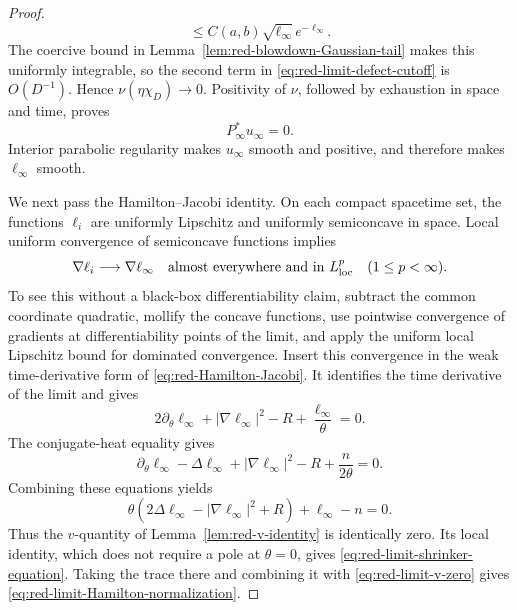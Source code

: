 \documentclass[10pt]{coll-l}
\theoremstyle{definition}
\theoremstyle{remark}
\numberwithin{section}{chapter}
\numberwithin{equation}{chapter}
\begin{document}
\begin{proof}
\begin{equation}
 \leq C(a,b)\sqrt{\ell_\infty}\,e^{-\ell_\infty}.      \label{eq:red-limit-gradient-density}
\end{equation}
The coercive bound in Lemma~\ref{lem:red-blowdown-Gaussian-tail} makes this
uniformly integrable, so the second term in
\eqref{eq:red-limit-defect-cutoff} is $O(D^{-1})$.  Hence
$\nu(\eta\chi_D)\to0$.  Positivity of $\nu$, followed by exhaustion in
space and time, proves
\begin{equation}
                         P_\infty^*u_\infty=0.           \label{eq:red-limit-conjugate-equality}
\end{equation}
Interior parabolic regularity makes $u_\infty$ smooth and positive, and
therefore makes $\ell_\infty$ smooth.

We next pass the Hamilton--Jacobi identity.  On each compact spacetime set,
the functions $\ell_i$ are uniformly Lipschitz and uniformly semiconcave in
space.  Local uniform convergence of semiconcave functions implies
\begin{equation}
          \nabla\ell_i\longrightarrow\nabla\ell_\infty
          \quad\text{almost everywhere and in }L^p_{\rm loc}
          \quad(1\leq p<\infty).                        \label{eq:red-limit-gradient-convergence}
\end{equation}
To see this without a black-box differentiability claim, subtract the common
coordinate quadratic, mollify the concave functions, use pointwise
convergence of gradients at differentiability points of the limit, and apply
the uniform local Lipschitz bound for dominated convergence.  Insert this
convergence in the weak time-derivative form of
\eqref{eq:red-Hamilton-Jacobi}.  It identifies the time derivative of the
limit and gives
\begin{equation}
 2\partial_\theta\ell_\infty+|\nabla\ell_\infty|^2-R
                     +\frac{\ell_\infty}\theta=0.       \label{eq:red-limit-Hamilton-Jacobi}
\end{equation}
The conjugate-heat equality gives
\begin{equation}
 \partial_\theta\ell_\infty-\Delta\ell_\infty
       +|\nabla\ell_\infty|^2-R+\frac n{2\theta}=0.     \label{eq:red-limit-ell-conjugate}
\end{equation}
Combining these equations yields
\begin{equation}
 \theta(2\Delta\ell_\infty-|\nabla\ell_\infty|^2+R)
       +\ell_\infty-n=0.                                \label{eq:red-limit-v-zero}
\end{equation}
Thus the $v$-quantity of Lemma~\ref{lem:red-v-identity} is identically zero.
Its local identity, which does not require a pole at $\theta=0$, gives
\eqref{eq:red-limit-shrinker-equation}.  Taking the trace there and combining
it with \eqref{eq:red-limit-v-zero} gives
\eqref{eq:red-limit-Hamilton-normalization}.


\end{proof}
\end{document}
